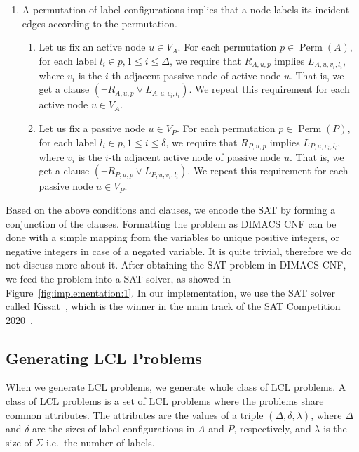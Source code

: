 \begin{enumerate}
\item
  A permutation of label configurations implies that a node labels its incident edges according to the permutation.
  \begin{enumerate}
  \item
    Let us fix an active node $u \in V_A$.
    For each permutation $p \in \operatorname{Perm}(A)$, for each label $l_i \in p, 1 \leq i \leq \Delta$, we require that $R_{A, u, p}$ implies $L_{A,u,v_i,l_i}$, where $v_i$ is the $i$-th adjacent passive node of active node $u$.
    That is, we get a clause $(\neg R_{A, u, p} \lor L_{A,u,v_i,l_i})$.
    We repeat this requirement for each active node $u \in V_A$.
    \label{enu:sat_conditions:3a}
  \item
    Let us fix a passive node $u \in V_P$.
    For each permutation $p \in \operatorname{Perm}(P)$, for each label $l_i \in p, 1 \leq i \leq \delta$, we require that $R_{P, u, p}$ implies $L_{P,u,v_i,l_i}$, where $v_i$ is the $i$-th adjacent active node of passive node $u$.
    That is, we get a clause $(\neg R_{P, u, p} \lor L_{P,u,v_i,l_i})$.
    We repeat this requirement for each passive node $u \in V_P$.
    \label{enu:sat_conditions:3b}
  \end{enumerate}
\end{enumerate}

Based on the above conditions and clauses, we encode the SAT by forming a conjunction of the clauses.
Formatting the problem as DIMACS CNF can be done with a simple mapping from the variables to unique positive integers, or negative integers in case of a negated variable.
It is quite trivial, therefore we do not discuss more about it.
After obtaining the SAT problem in DIMACS CNF, we feed the problem into a SAT solver, as showed in Figure~\ref{fig:implementation:1}.
In our implementation, we use the SAT solver called Kissat~\cite{BiereFazekasFleuryHeisinger-SAT-Competition-2020-solvers, Kissat}, which is the winner in the main track of the SAT Competition 2020~\cite{SatCompetition2020}.


\subsection{Generating LCL Problems} \label{sec:implementation:generating_lcl_problems}

When we generate LCL problems, we generate whole class of LCL problems.
A class of LCL problems is a set of LCL problems where the problems share common attributes.
The attributes are the values of a triple $(\Delta, \delta, \lambda)$, where $\Delta$ and $\delta$ are the sizes of label configurations in $A$ and $P$, respectively, and $\lambda$ is the size of $\Sigma$ i.e.\ the number of labels.

